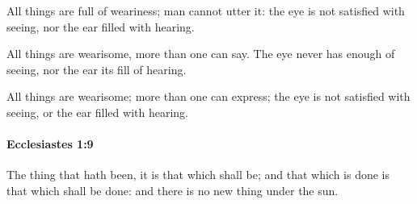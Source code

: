			\begin{versebox}
					\item[BHS] 
					\item[LXX] 
					\item[ASV] All things are full of weariness; man cannot utter it: the eye is not satisfied with seeing, nor the ear filled with hearing.
					\item[NIV] All things are wearisome, more than one can say. The eye never has enough of seeing, nor the ear its fill of hearing.
					\item[NRSV] All things are wearisome; more than one can express; the eye is not satisfied with seeing, or the ear filled with hearing.
			\end{versebox}

		\paragraph{Ecclesiastes 1:9} %
			\label{ECCLESIASTES-1-9}

			The thing that hath been, it is that which shall be; and that which is done is that which shall be done: and there is no new thing under the sun.

